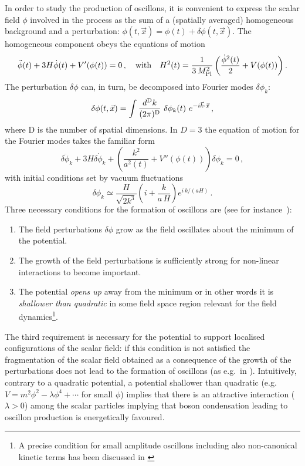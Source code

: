 \documentclass[12pt]{article}
\newcommand{\be}{\begin{equation}}
\newcommand{\ee}{\end{equation}}
\begin{document}
In order to study the production of oscillons, it is convenient to express the scalar field $\phi$ involved in the process as the sum of a (spatially averaged) homogeneous background and a perturbation: $\phi(t,\vec{x})=\phi(t) + \delta\phi(t,\vec{x})$. The homogeneous component obeys the equations of motion
\begin{equation}
\label{eq:homogeneousEOM}
\ddot{\phi}(t) + 3 H \dot{\phi}(t) + V'(\phi(t)) = 0\,,\quad\textrm{with}\quad H^2(t)=\frac{1}{3\,M^2_{\rm Pl}}\left(\frac{\dot{\phi}^2(t)}{2}+V(\phi(t))\right).
\end{equation}
The perturbation $\delta\phi$ can, in turn, be decomposed into Fourier modes $\delta \phi_k$: \begin{equation}
\delta\phi(t,\vec{x}) = \int \frac{d^{\rm D}k}{(2\pi)^{\rm D}}~ \delta \phi_k(t)~e^{-i\vec{k}\cdot\vec{x}}\,,
\label{eq:fourier}
\end{equation}
where D is the number of spatial dimensions. In $D = 3$ the equation of motion for the Fourier modes takes the familiar form
\begin{equation}
\label{eq:perturbationEOM}
\delta \ddot{\phi}_k + 3 H \delta \dot{\phi}_k + \left(\frac{k^2}{a^2(t)} + V''(\phi(t))\right) \delta \phi_k = 0 \,,
\end{equation}
with initial conditions set by vacuum fluctuations
\be
\delta\phi_k \simeq \frac{H}{\sqrt{2k^3}}\left(i+\frac{k}{a\,H}\right)e^{i\,k/(aH)}\,.
\label{eq:IC_fluctuations}
\ee
Three necessary conditions for the formation of oscillons are (see for instance~\cite{Gleiser:1993pt,Amin:2010dc}):
\begin{enumerate}
\item The field perturbations $\delta\phi$ grow as the field oscillates about the minimum of the potential.
\item The growth of the field perturbations is sufficiently strong for non-linear interactions to become important.
\item The potential \textit{opens up} away from the minimum or in other words it is \textit{shallower than quadratic} in some field space region relevant for the field dynamics\footnote{A precise condition for small amplitude oscillons including also non-canonical kinetic terms has been discussed in \cite{Amin:2013ika}}.
\end{enumerate}
The third requirement is necessary for the potential to support localised configurations of the scalar field: if this condition is not satisfied the fragmentation of the scalar field obtained as a consequence of the growth of the perturbations does not lead to the formation of oscillons (as e.g.\ in \cite{Felder:2006cc}). Intuitively, contrary to a quadratic potential, a potential shallower than quadratic (e.g. $V=m^2\phi^2-\lambda\phi^4+\cdots$ for small $\phi$) implies that there is an attractive interaction ($\lambda>0$) among the scalar particles implying that boson condensation leading to oscillon production is energetically favoured. 
\end{document}
